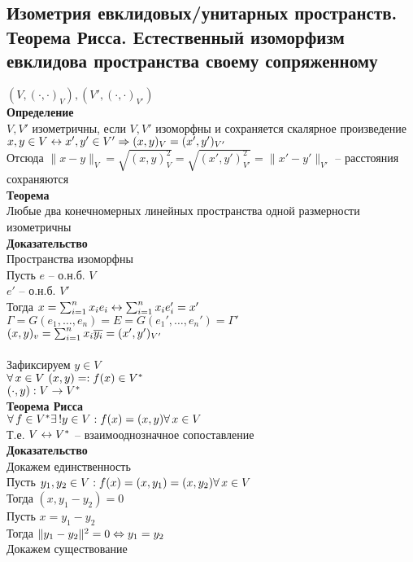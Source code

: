 \documentclass[12pt]{article}
\begin{document}
\subsection{Изометрия евклидовых/унитарных пространств. Теорема Рисса. Естественный изоморфизм евклидова пространства своему сопряженному}
$(V, (\cdot, \cdot)_V), (V', (\cdot, \cdot)_{V'})$\\
\textbf{Определение}\\
$V, V'$ изометричны, если $V, V'$ изоморфны и сохраняется скалярное произведение\\
$x,y\in V \leftrightarrow x',y' \in V' \Rightarrow (x,y)_V = (x', y')_{V'}$\\
Отсюда $\|x-y\|_V = \sqrt{(x,y)_V^2} = \sqrt{(x',y')_{V'}^2} = \|x'-y'\|_{V'}$ -- расстояния сохраняются\\
\textbf{Теорема}\\
Любые два конечномерных линейных пространства одной размерности изометричны\\
\textbf{Доказательство}\\
Пространства изоморфны\\
Пусть $e$ -- о.н.б. $V$\\
$e'$ -- о.н.б. $V'$\\
Тогда $x = \sum_{i=1}^n x_i e_i \leftrightarrow \sum_{i=1}^n x_i e_i' = x'$\\
$\Gamma = G(e_1, \ldots, e_n) = E = G(e_1', \ldots, e_n') = \Gamma'$\\
$(x,y)_v = \sum_{i=1}^n x_i\overline{y_i} = (x',y')_{V'}$\\\\
Зафиксируем $y \in V$\\
$\forall\, x \in V\ (x,y)=:f(x) \in V^*$\\
$(\cdot, y): V \rightarrow V^*$\\
\textbf{Теорема Рисса}\\
$\forall\, f \in V^* \exists\,! y \in V: f(x) = (x,y) \forall\, x \in V$\\
Т.е. $V \leftrightarrow V^*$ -- взаимооднозначное сопоставление\\
\textbf{Доказательство}\\
Докажем единственность\\
Пусть $y_1, y_2 \in V: f(x) = (x, y_1) = (x, y_2) \forall\, x \in V$\\
Тогда $(x, y_1 - y_2) = 0$\\
Пусть $x = y_1 - y_2$\\
Тогда $\|y_1-y_2\|^2 = 0 \Leftrightarrow y_1 = y_2$\\
Докажем существование\\
\end{document}
